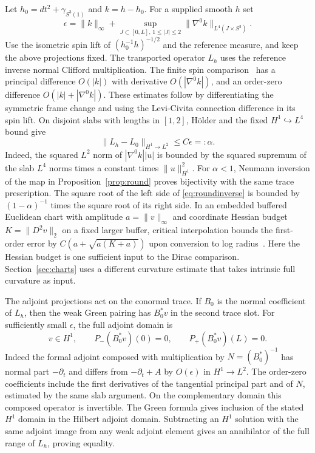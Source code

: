 \documentclass[11pt]{article}
\theoremstyle{remark}
\begin{document}
Let \(h_0=dt^2+\gamma_{S^3(1)}\) and \(k=h-h_0\). For a supplied smooth \(h\) set
\[
 \epsilon=\|k\|_\infty+\sup_{J\subset[0,L],\,1\le |J|\le2}
                          \|\nabla^0k\|_{L^4(J\times S^3)} .
\]
Use the isometric spin lift of \((h_0^{-1}h)^{-1/2}\) and the reference measure, and keep the above projections fixed. The transported operator \(L_h\) uses the reference inverse normal Clifford multiplication. The finite spin comparison~\cite[Theorem~3.1 and Remark~3.2]{BourguignonGauduchon1992} has a principal difference \(O(|k|)\) with derivative \(O(|\nabla^0 k|)\), and an order-zero difference \(O(|k|+|\nabla^0 k|)\). These estimates follow by differentiating the symmetric frame change and using the Levi-Civita connection difference in its spin lift. On disjoint slabs with lengths in \([1,2]\), Hölder and the fixed \(H^1\hookrightarrow L^4\) bound give
\[
 \|L_h-L_0\|_{H^1\to L^2}\le C\epsilon=:\alpha .
\]
Indeed, the squared \(L^2\) norm of \(|\nabla^0k||u|\) is bounded by the squared supremum of the slab \(L^4\) norms times a constant times \(\|u\|_{H^1}^2\). For \(\alpha<1\), Neumann inversion of the map in Proposition~\ref{prop:round} proves bijectivity with the same trace prescription. The square root of the left side of \eqref{eq:roundinverse} is bounded by \((1-\alpha)^{-1}\) times the square root of its right side. In an embedded buffered Euclidean chart with amplitude \(a=\|v\|_\infty\) and coordinate Hessian budget \(K=\|D^2v\|_2\) on a fixed larger buffer, critical interpolation bounds the first-order error by \(C(a+\sqrt{a(K+a)})\) upon conversion to log radius~\cite{Baker2026MarkedLimits}. Here the Hessian budget is one sufficient input to the Dirac comparison. Section~\ref{sec:charts} uses a different curvature estimate that takes intrinsic full curvature as input.

The adjoint projections act on the conormal trace. If \(B_0\) is the normal coefficient of \(L_h\), then the weak Green pairing has \(B_0^*v\) in the second trace slot. For sufficiently small \(\epsilon\), the full adjoint domain is
\[
 v\in H^1,\qquad P_-(B_0^*v)(0)=0,\qquad P_+(B_0^*v)(L)=0 .
\]
Indeed the formal adjoint composed with multiplication by \(N=(B_0^*)^{-1}\) has normal part \(-\partial_t\) and differs from \(-\partial_t+A\) by \(O(\epsilon)\) in \(H^1\to L^2\). The order-zero coefficients include the first derivatives of the tangential principal part and of \(N\), estimated by the same slab argument. On the complementary domain this composed operator is invertible. The Green formula gives inclusion of the stated \(H^1\) domain in the Hilbert adjoint domain. Subtracting an \(H^1\) solution with the same adjoint image from any weak adjoint element gives an annihilator of the full range of \(L_h\), proving equality.
\end{document}
